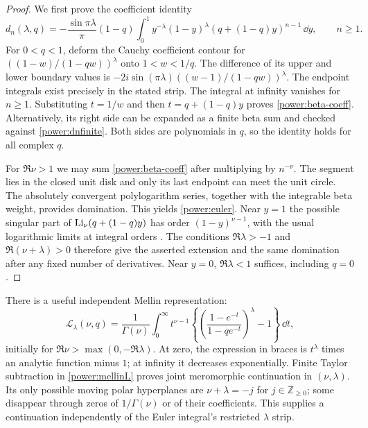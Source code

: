\begin{proof}
We first prove the coefficient identity
\begin{equation}\label{power:beta-coeff}
 d_n(\lambda,q)=-\frac{\sin\pi\lambda}{\pi}(1-q)
 \int_0^1y^{-\lambda}(1-y)^\lambda
                 (q+(1-q)y)^{n-1}\,\dd y,\qquad n\ge1.
\end{equation}
For $0<q<1$, deform the Cauchy coefficient contour for
$((1-w)/(1-qw))^\lambda$ onto $1<w<1/q$.  The difference of its
upper and lower boundary values is
$-2i\sin(\pi\lambda)((w-1)/(1-qw))^\lambda$.
The endpoint integrals exist precisely in the stated strip.  The
integral at infinity vanishes for $n\ge1$.  Substituting $t=1/w$
and then $t=q+(1-q)y$ proves \eqref{power:beta-coeff}.
Alternatively, its right side can be expanded as a finite beta sum
and checked against \eqref{power:dnfinite}.  Both sides are
polynomials in $q$, so the identity holds for all complex $q$.

For $\Re\nu>1$ we may sum \eqref{power:beta-coeff} after multiplying
by $n^{-\nu}$.  The segment lies in the closed unit disk and only
its last endpoint can meet the unit circle.  The absolutely convergent
polylogarithm series, together with the integrable beta weight, provides
domination.  This yields \eqref{power:euler}.  Near $y=1$ the possible
singular part of $\operatorname{Li}_\nu(q+(1-q)y)$ has order
$(1-y)^{\nu-1}$, with the usual logarithmic limits at integral
orders \cite[Eq.~25.12.12]{DLMF}.  The conditions
$\Re\lambda>-1$ and $\Re(\nu+\lambda)>0$ therefore give the
asserted extension and the same domination after any fixed number of
derivatives.  Near $y=0$, $\Re\lambda<1$ suffices, including $q=0$.
\end{proof}

There is a useful independent Mellin representation:
\begin{equation}\label{power:mellinL}
 \mathcal L_\lambda(\nu,q)=\frac1{\Gamma(\nu)}
 \int_0^\infty t^{\nu-1}
 \left\{\left(\frac{1-e^{-t}}{1-qe^{-t}}\right)^\lambda-1\right\}
 \,\dd t,
\end{equation}
initially for $\Re\nu>\max(0,-\Re\lambda)$.
At zero, the expression in braces is $t^\lambda$ times an analytic
function minus $1$; at infinity it decreases exponentially.
Finite Taylor subtraction in \eqref{power:mellinL} proves joint
meromorphic continuation in $(\nu,\lambda)$.  Its only possible
moving polar hyperplanes are
$\nu+\lambda=-j$ for $j\in\mathbb Z_{\ge0}$; some disappear
through zeros of $1/\Gamma(\nu)$ or of their coefficients.
This supplies a continuation independently of the Euler integral's
restricted $\lambda$ strip.

